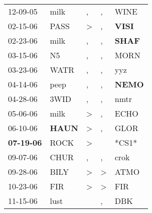 \begin{supertabular}{p{0.07\textwidth}p{0.06\textwidth}p{0.02\textwidth}p{0.02\textwidth}p{0.06\textwidth}}
          12-09-05\textsuperscript{} &           milk\textsuperscript{} &                , &                , &           WINE\textsuperscript{} \\
          02-15-06\textsuperscript{} &           PASS\textsuperscript{} &     \textgreater &                , &  \textbf{VISI\textsuperscript{}} \\
          02-23-06\textsuperscript{} &           milk\textsuperscript{} &                , &                , &  \textbf{SHAF\textsuperscript{}} \\
          03-15-06\textsuperscript{} &             N5\textsuperscript{} &                , &                , &           MORN\textsuperscript{} \\
          03-23-06\textsuperscript{} &           WATR\textsuperscript{} &                , &                , &            yyz\textsuperscript{} \\
          04-14-06\textsuperscript{} &           peep\textsuperscript{} &                , &                , &  \textbf{NEMO\textsuperscript{}} \\
          04-28-06\textsuperscript{} &           3WID\textsuperscript{} &                , &                , &           nmtr\textsuperscript{} \\
          05-06-06\textsuperscript{} &           milk\textsuperscript{} &     \textgreater &                , &           ECHO\textsuperscript{} \\
          06-10-06\textsuperscript{} &  \textbf{HAUN\textsuperscript{}} &     \textgreater &                , &           GLOR\textsuperscript{} \\
 \textbf{07-19-06\textsuperscript{}} &           ROCK\textsuperscript{} &     \textgreater &                  &                            *CS1* \\
          09-07-06\textsuperscript{} &           CHUR\textsuperscript{} &                , &                , &           crok\textsuperscript{} \\
          09-28-06\textsuperscript{} &           BILY\textsuperscript{} &     \textgreater &     \textgreater &           ATMO\textsuperscript{} \\
          10-23-06\textsuperscript{} &            FIR\textsuperscript{} &     \textgreater &     \textgreater &            FIR\textsuperscript{} \\
          11-15-06\textsuperscript{} &           lust\textsuperscript{} &                  &                , &            DBK\textsuperscript{} \\

\end{supertabular}
